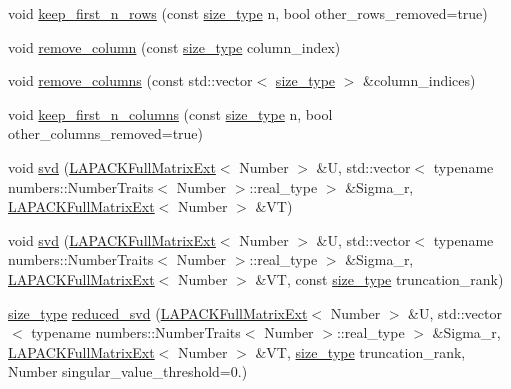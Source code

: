 \begin{DoxyCompactItemize}
\item 
void \hyperlink{classLAPACKFullMatrixExt_a6cb733ec47cbcb9fed535362616d7e07}{keep\+\_\+first\+\_\+n\+\_\+rows} (const \hyperlink{classLAPACKFullMatrixExt_a5cf5f4a6104dc17029210b5ca52bf574}{size\+\_\+type} n, bool other\+\_\+rows\+\_\+removed=true)
\item 
void \hyperlink{classLAPACKFullMatrixExt_a4b4bb2b69261608f54c42f329d272195}{remove\+\_\+column} (const \hyperlink{classLAPACKFullMatrixExt_a5cf5f4a6104dc17029210b5ca52bf574}{size\+\_\+type} column\+\_\+index)
\item 
void \hyperlink{classLAPACKFullMatrixExt_acf4f82469289156a7d3993def0481152}{remove\+\_\+columns} (const std\+::vector$<$ \hyperlink{classLAPACKFullMatrixExt_a5cf5f4a6104dc17029210b5ca52bf574}{size\+\_\+type} $>$ \&column\+\_\+indices)
\item 
void \hyperlink{classLAPACKFullMatrixExt_a9c94fd182607dca5b2aa56bca4eb0523}{keep\+\_\+first\+\_\+n\+\_\+columns} (const \hyperlink{classLAPACKFullMatrixExt_a5cf5f4a6104dc17029210b5ca52bf574}{size\+\_\+type} n, bool other\+\_\+columns\+\_\+removed=true)
\item 
void \hyperlink{classLAPACKFullMatrixExt_a5be14a4d7f9c615f940e870b85d09ecd}{svd} (\hyperlink{classLAPACKFullMatrixExt}{L\+A\+P\+A\+C\+K\+Full\+Matrix\+Ext}$<$ Number $>$ \&U, std\+::vector$<$ typename numbers\+::\+Number\+Traits$<$ Number $>$\+::real\+\_\+type $>$ \&Sigma\+\_\+r, \hyperlink{classLAPACKFullMatrixExt}{L\+A\+P\+A\+C\+K\+Full\+Matrix\+Ext}$<$ Number $>$ \&VT)
\item 
void \hyperlink{classLAPACKFullMatrixExt_a5e51e358cbef31895021abfff0940edd}{svd} (\hyperlink{classLAPACKFullMatrixExt}{L\+A\+P\+A\+C\+K\+Full\+Matrix\+Ext}$<$ Number $>$ \&U, std\+::vector$<$ typename numbers\+::\+Number\+Traits$<$ Number $>$\+::real\+\_\+type $>$ \&Sigma\+\_\+r, \hyperlink{classLAPACKFullMatrixExt}{L\+A\+P\+A\+C\+K\+Full\+Matrix\+Ext}$<$ Number $>$ \&VT, const \hyperlink{classLAPACKFullMatrixExt_a5cf5f4a6104dc17029210b5ca52bf574}{size\+\_\+type} truncation\+\_\+rank)
\item 
\hyperlink{classLAPACKFullMatrixExt_a5cf5f4a6104dc17029210b5ca52bf574}{size\+\_\+type} \hyperlink{classLAPACKFullMatrixExt_a0a6e1d0e88bc84b372b1d0a0f4b79f86}{reduced\+\_\+svd} (\hyperlink{classLAPACKFullMatrixExt}{L\+A\+P\+A\+C\+K\+Full\+Matrix\+Ext}$<$ Number $>$ \&U, std\+::vector$<$ typename numbers\+::\+Number\+Traits$<$ Number $>$\+::real\+\_\+type $>$ \&Sigma\+\_\+r, \hyperlink{classLAPACKFullMatrixExt}{L\+A\+P\+A\+C\+K\+Full\+Matrix\+Ext}$<$ Number $>$ \&VT, \hyperlink{classLAPACKFullMatrixExt_a5cf5f4a6104dc17029210b5ca52bf574}{size\+\_\+type} truncation\+\_\+rank, Number singular\+\_\+value\+\_\+threshold=0.)

\end{DoxyCompactItemize}
